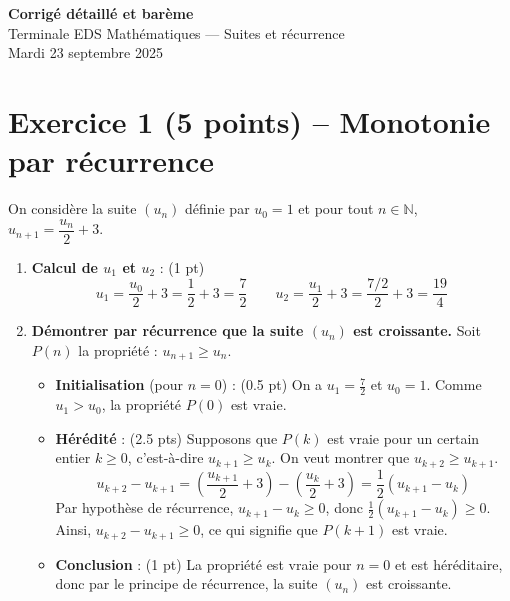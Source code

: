 \documentclass[14pt, a4paper]{extarticle}
\newcommand{\N}{\mathbb{N}}
\begin{document}
\begin{center}
    \Large\textbf{Corrigé détaillé et barème}\\[0.2cm]
    \large Terminale EDS Mathématiques — Suites et récurrence \\
    Mardi 23 septembre 2025
\end{center}

\vspace{0.5cm}


\section*{Exercice 1 (5 points) -- Monotonie par récurrence}
On considère la suite $(u_n)$ définie par $u_0 = 1$ et pour tout $n \in \N$, $u_{n+1} = \dfrac{u_n}{2} + 3$.

\begin{enumerate}
    \item \textbf{Calcul de $u_1$ et $u_2$} : (1 pt)
    \[ u_1 = \frac{u_0}{2} + 3 = \frac{1}{2} + 3 = \frac{7}{2} \qquad u_2 = \frac{u_1}{2} + 3 = \frac{7/2}{2} + 3 = \frac{19}{4} \]

    \item \textbf{Démontrer par récurrence que la suite $(u_n)$ est croissante.}
    Soit $P(n)$ la propriété : $u_{n+1} \ge u_n$.
    \begin{itemize}
        \item \textbf{Initialisation} (pour $n=0$) : (0.5 pt)
        On a $u_1 = \frac{7}{2}$ et $u_0 = 1$. Comme $u_1 > u_0$, la propriété $P(0)$ est vraie.

        \item \textbf{Hérédité} : (2.5 pts)
        Supposons que $P(k)$ est vraie pour un certain entier $k \ge 0$, c'est-à-dire $u_{k+1} \ge u_k$.
        On veut montrer que $u_{k+2} \ge u_{k+1}$.
        \[ u_{k+2} - u_{k+1} = \left(\frac{u_{k+1}}{2} + 3\right) - \left(\frac{u_k}{2} + 3\right) = \frac{1}{2}(u_{k+1} - u_k) \]
        Par hypothèse de récurrence, $u_{k+1} - u_k \ge 0$, donc $\frac{1}{2}(u_{k+1} - u_k) \ge 0$.
        Ainsi, $u_{k+2} - u_{k+1} \ge 0$, ce qui signifie que $P(k+1)$ est vraie.

        \item \textbf{Conclusion} : (1 pt)
        La propriété est vraie pour $n=0$ et est héréditaire, donc par le principe de récurrence, la suite $(u_n)$ est croissante.
    \end{itemize}
\end{enumerate}
\end{document}
